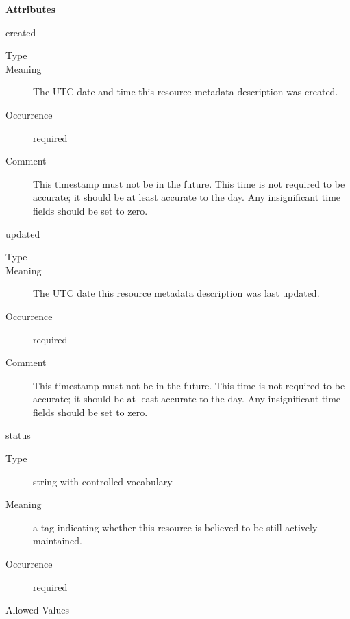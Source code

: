 \documentclass[11pt,a4paper]{ivoa}
\begin{document}
\vspace{0.5ex}\noindent\textbf{ Attributes}

\begingroup\small\begin{bigdescription}
\item[created]
\begin{description}
\item[Type] 
\item[Meaning] 
              The UTC date and time this resource metadata description
              was created. 
            
\item[Occurrence] required
\item[Comment] 
              This timestamp must not be in the future.  This time is
              not required to be accurate; it should be at least
              accurate to the day.  Any insignificant time fields
              should be set to zero. 
            
\end{description}
\item[updated]
\begin{description}
\item[Type] 
\item[Meaning] 
              The UTC date this resource metadata description was last updated.
            
\item[Occurrence] required
\item[Comment] 
              This timestamp must not be in the future.  This time is
              not required to be accurate; it should be at least
              accurate to the day.  Any insignificant time fields
              should be set to zero. 
            
\end{description}
\item[status]
\begin{description}
\item[Type] string with controlled vocabulary
\item[Meaning] 
              a tag indicating whether this resource is believed to be still
              actively maintained.
            
\item[Occurrence] required

\item[Allowed Values]\hfil
{}
\end{description}
\end{bigdescription}
\end{document}
